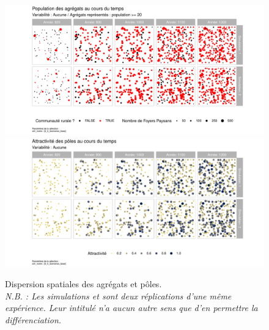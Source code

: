 
\begin{figure}[H]
	\centering
	\includegraphics[width=\linewidth]{img/results_6_6/Agregats_Carte_Haut.pdf}
	\includegraphics[width=\linewidth]{img/results_6_6/Poles_Carte_Haut.pdf}
	\caption[Dispersion spatiales des agrégats et pôles.]{Dispersion spatiales des agrégats et pôles.\\
	\textit{N.B. : Les simulations \fg{} et \fg{} sont deux réplications d'une même expérience. Leur intitulé n'a aucun autre sens que d'en permettre la différenciation.}}
	\label{fig:results-carte-agregats_poles}
\end{figure}

